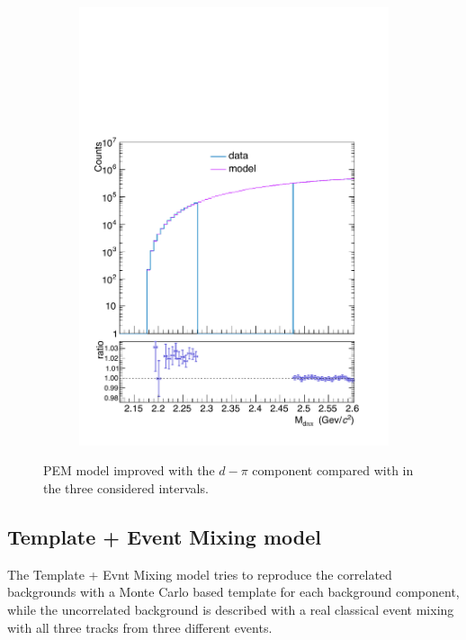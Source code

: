 \begin{figure}
\begin{subfigure}{.33\textwidth}
  \includegraphics[width=\linewidth]{gfx/PEMimp2}
  \caption{}
  \label{fig:pem_imp23}
\end{subfigure}
\caption{PEM model improved with the $d-\pi$ component compared with \minv in the three considered \pt intervals.}
\label{fig:PEMimp}
\end{figure}

%
\subsection{Template + Event Mixing model} \label{sec:tem}

The Template + Evnt Mixing model tries to reproduce the correlated backgrounds with a Monte Carlo based template
for each background component, while the uncorrelated background is described with a real classical event mixing
with all three tracks from three different events.

